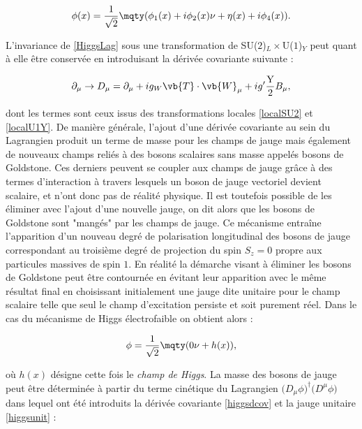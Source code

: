         \begin{equation}
            \phi(x)=\frac{1}{\sqrt{2}}\mqty(\phi_1(x)+i\phi_2(x) \\ \nu+\eta(x)+i\phi_4(x)).
        \end{equation}
        
        L'invariance de \ref{HiggsLag} sous une transformation de SU($2$)$_L\times$U($1$)$_Y$ peut quant à elle être conservée en introduisant la dérivée covariante suivante :

        \begin{equation}
            \partial_{\mu}\rightarrow D_{\mu}=\partial_{\mu}+ig_W\vb{T}\cdot\vb{W}_{\mu}+ig'\frac{\mbox{Y}}{2}B_{\mu},
        \label{higgsdcov}
        \end{equation}

        dont les termes sont ceux issus des transformations locales \ref{localSU2} et \ref{localU1Y}. De manière générale, l'ajout d'une dérivée covariante au sein du Lagrangien produit un terme de masse pour les champs de jauge mais également de nouveaux champs reliés à des bosons scalaires sans masse appelés bosons de Goldstone. Ces derniers peuvent se coupler aux champs de jauge grâce à des termes d'interaction à travers lesquels un boson de jauge vectoriel devient scalaire, et n'ont donc pas de réalité physique. Il est toutefois possible de les éliminer avec l'ajout d'une nouvelle jauge, on dit alors que les bosons de Goldstone sont "mangés" par les champs de jauge. Ce mécanisme entraîne l'apparition d'un nouveau degré de polarisation longitudinal des bosons de jauge correspondant au troisième degré de projection du spin $S_z=0$ propre aux particules massives de spin $1$. En réalité la démarche visant à éliminer les bosons de Goldstone peut être contournée en évitant leur apparition avec le même résultat final en choisissant initialement une jauge dite unitaire pour le champ scalaire telle que seul le champ d'excitation persiste et soit purement réel. Dans le cas du mécanisme de Higgs électrofaible on obtient alors :

        \begin{equation}
            \phi=\frac{1}{\sqrt{2}}\mqty(0 \\ \nu+h(x)),
        \label{higgsunit}
        \end{equation}

        où $h(x)$ désigne cette fois le \textit{champ de Higgs}. La masse des bosons de jauge peut être déterminée à partir du terme cinétique du Lagrangien $\bigl(D_{\mu}\phi\bigr)^{\dag}\bigl(D^{\mu}\phi\bigr)$ dans lequel ont été introduits la dérivée covariante \ref{higgsdcov} et la jauge unitaire \ref{higgsunit} :

